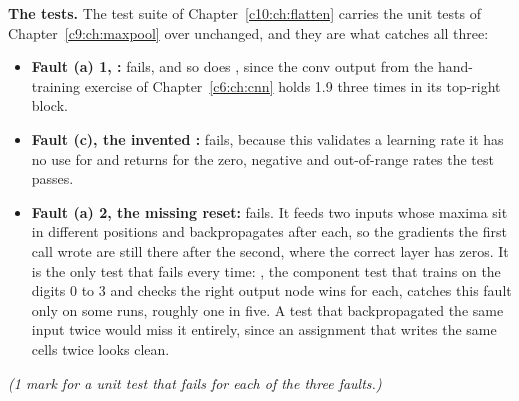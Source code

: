\textbf{The tests.} The test suite of Chapter~\ref{c10:ch:flatten} carries the  unit
tests of Chapter~\ref{c9:ch:maxpool} over unchanged, and they are what catches all three:
\begin{itemize}
  \item \textbf{Fault (a) 1, \code{>=}:}  fails, and so
    does , since the conv output from the
    hand-training exercise of Chapter~\ref{c6:ch:cnn} holds 1.9 three times in its top-right block.
  \item \textbf{Fault (c), the invented :} 
    fails, because this  validates a learning rate it has no use for and returns
     for the zero, negative and out-of-range rates the test passes.
  \item \textbf{Fault (a) 2, the missing reset:} 
    fails. It feeds two inputs whose maxima sit in different positions and backpropagates after
    each, so the gradients the first call wrote are still there after the second, where the correct
    layer has zeros. It is the only test that fails every time:
    , the component test that trains on the digits 0 to 3 and
    checks the right output node wins for each, catches this fault only on some runs, roughly one
    in five. A test that backpropagated the same input twice would miss it entirely, since an
    assignment that writes the same cells twice looks clean.
\end{itemize}
\textit{(1 mark for a unit test that fails for each of the three faults.)}


